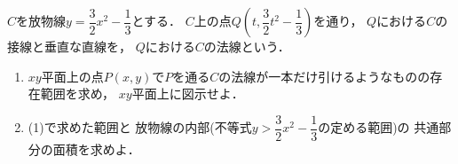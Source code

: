 \documentclass[../../main.tex]{subfiles}
\begin{document}
$C$を放物線$\displaystyle y=\dfrac{3}{2}x^2-\dfrac{1}{3}$とする．
$C$上の点$\displaystyle Q \left( t,\dfrac{3}{2}t^2-\dfrac{1}{3} \right)$を通り，
$Q$における$C$の接線と垂直な直線を，
$Q$における$C$の法線という．
\begin{enumerate}
  \item $xy$平面上の点$P(x,y)$で$P$を通る$C$の法線が一本だけ引けるようなものの存在範囲を求め，
    $xy$平面上に図示せよ．
  \item (1)で求めた範囲と
    放物線の内部(不等式$\displaystyle y>\dfrac{3}{2}x^2-\dfrac{1}{3}$の定める範囲)の
    共通部分の面積を求めよ．
\end{enumerate}
\end{document}

